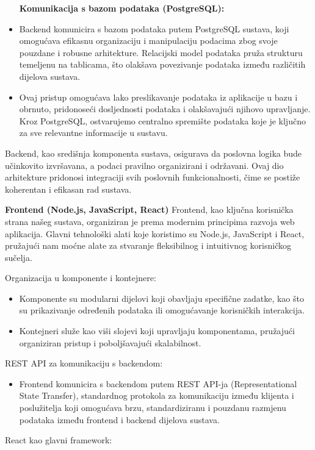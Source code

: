 \begin{itemize}
\textbf{Komunikacija s bazom podataka (PostgreSQL):}
\item Backend komunicira s bazom podataka putem PostgreSQL sustava, koji omogućava efikasnu organizaciju i manipulaciju podacima zbog svoje pouzdane i robusne arhitekture. Relacijski model podataka pruža strukturu temeljenu na tablicama, što olakšava povezivanje podataka između različitih dijelova sustava.
    \item Ovaj pristup omogućava lako preslikavanje podataka iz aplikacije u bazu i obrnuto, pridonoseći dosljednosti podataka i olakšavajući njihovo upravljanje. Kroz PostgreSQL, ostvarujemo centralno spremište podataka koje je ključno za sve relevantne informacije u sustavu.
\end{itemize}
Backend, kao središnja komponenta sustava, osigurava da poslovna logika bude učinkovito izvršavana, a podaci pravilno organizirani i održavani. Ovaj dio arhitekture pridonosi integraciji svih poslovnih funkcionalnosti, čime se postiže koherentan i efikasan rad sustava.\newline

 
 

\textbf{Frontend (Node.js, JavaScript, React)}
Frontend, kao ključna korisnička strana našeg sustava, organiziran je prema modernim principima razvoja web aplikacija. Glavni tehnološki alati koje koristimo su Node.js, JavaScript i React, pružajući nam moćne alate za stvaranje fleksibilnog i intuitivnog korisničkog sučelja.

Organizacija u komponente i kontejnere:

\begin{itemize}
    \item Komponente su modularni dijelovi koji obavljaju specifične zadatke, kao što su prikazivanje određenih podataka ili omogućavanje korisničkih interakcija.
    \item Kontejneri služe kao viši slojevi koji upravljaju komponentama, pružajući organiziran pristup i poboljšavajući skalabilnost.

\end{itemize}
REST API za komunikaciju s backendom:

\begin{itemize}
    \item Frontend komunicira s backendom putem REST API-ja (Representational State Transfer), standardnog protokola za komunikaciju između klijenta i poslužitelja koji omogućava brzu, standardiziranu i pouzdanu razmjenu podataka između frontend i backend dijelova sustava.
\end{itemize}
React kao glavni framework:

